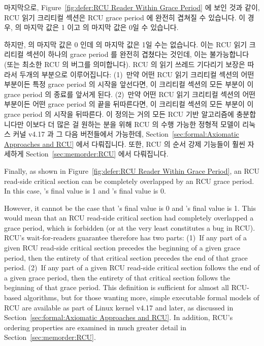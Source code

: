 마지막으로,
Figure~\ref{fig:defer:RCU Reader Within Grace Period} 에 보인 것과 같이, RCU
읽기 크리티컬 섹션은 RCU grace period 에 완전히 겹쳐질 수 있습니다.
이 경우,  의 마지막 값은 1 이고  의 마지막 값은 0일 수 있습니다.

하지만,  의 마지막 값은 0 인데  의 마지막 값은 1일 수는 없습니다.
이는 RCU 읽기 크리티컬 섹션이 하나의 grace period 를 완전히 겹쳤다는 것인데,
이는 불가능합니다 (또는 최소한 RCU 의 버그를 의미합니다).
RCU 의 읽기 쓰레드 기다리기 보장은 따라서 두개의 부분으로 이루어집니다:
(1)~만약 어떤 RCU 읽기 크리티컬 섹션의 어떤 부분이든 특정 grace period 의
시작을 앞선다면, 이 크리티컬 섹션의 모든 부분이 이 grace period 의 종료를
앞서게 된다.
(2)~만약 어떤 RCU 읽기 크리티컬 섹션의 어떤 부분이든 어떤 grace period 의 끝을
뒤따른다면, 이 크리티컬 섹션의 모든 부분이 이 grace period 의 시작을 뒤따른다.
이 정의는 거의 모든 RCU 기반 알고리즘에 충분합니다만 이보다 더 많은 걸 원하는
분을 위해 RCU 의 수행 가능한 정형적 모델이 리눅스 커널 v4.17 과 그 다음
버전들에서 가능한데, 
Section~\ref{sec:formal:Axiomatic Approaches and RCU} 에서 다뤄집니다.
또한, RCU 의 순서 강제 기능들이 훨씬 자세하게 Section~\ref{sec:memorder:RCU}
에서 다뤄집니다.

\iffalse

Finally, as shown in
Figure~\ref{fig:defer:RCU Reader Within Grace Period},
an RCU read-side critical section can be completely overlapped by
an RCU grace period.
In this case, 's final value is 1 and 's final value is 0.

However, it cannot be the case that 's final value is 0 and 's
final value is 1.
This would mean that an RCU read-side critical section had completely
overlapped a grace period, which is forbidden (or at the very least
constitutes a bug in RCU).
RCU's wait-for-readers guarantee therefore has two parts:
(1)~If any part of a given RCU read-side critical section precedes
the beginning of a given grace period, then the entirety of that
critical section precedes the end of that grace period.
(2)~If any part of a given RCU read-side critical section follows
the end of a given grace period, then the entirety of that
critical section follows the beginning of that grace period.
This definition is sufficient for almost all RCU-based algorithms, but
for those wanting more,
simple executable formal models of RCU are available
as part of Linux kernel v4.17 and later, as discussed in
Section~\ref{sec:formal:Axiomatic Approaches and RCU}.
In addition, RCU's ordering properties are examined in much
greater detail in Section~\ref{sec:memorder:RCU}.


